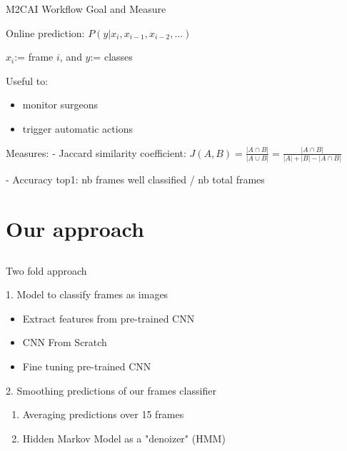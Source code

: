 \begin{frame}{M2CAI Workflow Goal and Measure}
	
	  Online prediction: $P(y | x_i, x_{i-1}, x_{i-2}, ...)$  
		
		$x_i$:= frame $i$, and $y$:= classes
		
		
		
		Useful to:
		\begin{itemize}
			\item monitor surgeons
			\item trigger automatic actions
		\end{itemize}
		
		
		Measures:
		- Jaccard similarity coefficient:
	    $J(A,B) = \frac{| A \cap B |}{| A \cup B|} = \frac{| A \cap B |}{| A| + |B| - |A \cap B|}$
	    
	  - Accuracy top1: nb frames well classified / nb total frames
		
\end{frame}




\section{Our approach} \subsection{}\label{}

\begin{frame}{Two fold approach}

	\begin{block}{1. Model to classify frames as images}
	\begin{itemize}
		\item Extract features from pre-trained CNN
		\item CNN From Scratch
		\item Fine tuning pre-trained CNN
	\end{itemize}
	\end{block}
	
	\begin{block}{2. Smoothing predictions of our frames classifier}
	\begin{enumerate}	
		\item Averaging predictions over 15 frames %
		\item Hidden Markov Model as a "denoizer" (HMM)
	\end{enumerate}
	\end{block}
	
\end{frame}


